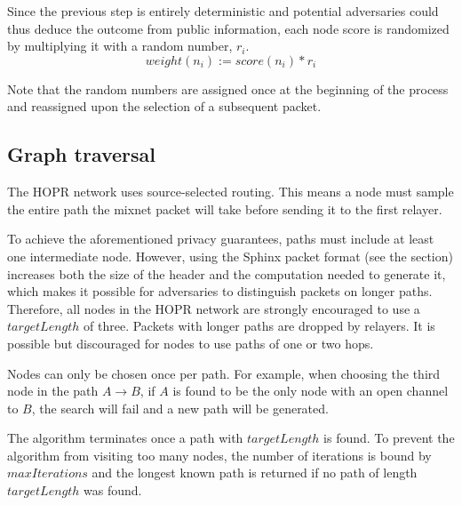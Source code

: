 Since the previous step is entirely deterministic and potential adversaries could thus deduce the outcome from public information, each node score is randomized by multiplying it with a random number, $r_i$.
$$weight(n_i) := score(n_i) * r_i$$

Note that the random numbers are assigned once at the beginning of the process and reassigned upon the selection of a subsequent packet.

\subsection{Graph traversal}
\label{sec:path-selection:graph-traversal}

The HOPR network uses source-selected routing. This means a node must sample the entire path the mixnet packet will take before sending it to the first relayer.

To achieve the aforementioned privacy guarantees, paths must include at least one intermediate node. However, using the Sphinx packet format (see the  section) increases both the size of the header and the computation needed to generate it, which makes it possible for adversaries to distinguish packets on longer paths. Therefore, all nodes in the HOPR network are strongly encouraged to use a $targetLength$ of three. Packets with longer paths are dropped by relayers. It is possible but discouraged for nodes to use paths of one or two hops.

Nodes can only be chosen once per path. For example, when choosing the third node in the path $A\rightarrow B$, if $A$ is found to be the only node with an open channel to $B$, the search will fail and a new path will be generated.

The algorithm terminates once a path with $targetLength$ is found. To prevent the algorithm from visiting too many nodes, the number of iterations is bound by $maxIterations$ and the longest known path is returned if no path of length $targetLength$ was found.

